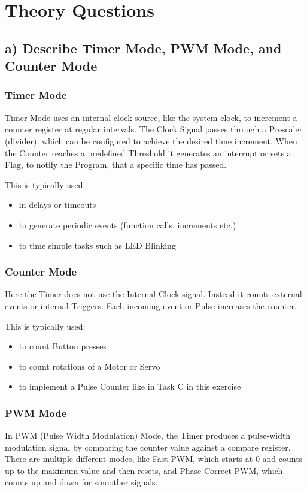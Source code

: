 \section{Theory Questions}

\subsection{a) Describe Timer Mode, PWM Mode, and Counter Mode}

\subsubsection*{Timer Mode}
Timer Mode uses an internal clock source, like the system clock, to increment a counter register at regular intervals. 
The Clock Signal passes through a Prescaler (divider), which can be configured to achieve the desired time increment. 
When the Counter reaches a predefined Threshold it generates an interrupt or sets a Flag, to notify the Program, that a specific time has passed.

This is typically used:
\begin{itemize}
    \item in delays or timeouts
    \item to generate periodic events (function calls, increments etc.)
    \item to time simple tasks such as LED Blinking
\end{itemize}

\subsubsection*{Counter Mode}
Here the Timer does not use the Internal Clock signal. Instead it counts external events or internal Triggers.
Each incoming event or Pulse increases the counter.

This is typically used:
\begin{itemize}
    \item to count Button presses
    \item to count rotations of a Motor or Servo
    \item to implement a Pulse Counter like in Task C in this exercise
\end{itemize}

\subsubsection*{PWM Mode}
In PWM (Pulse Width Modulation) Mode, the Timer produces a pulse-width modulation signal by comparing the counter value against a compare register.  
There are multiple different modes, like Fast-PWM, which starts at 0 and counts up to the maximum value and then resets, and Phase Correct PWM, which counts up and down for smoother signals.

